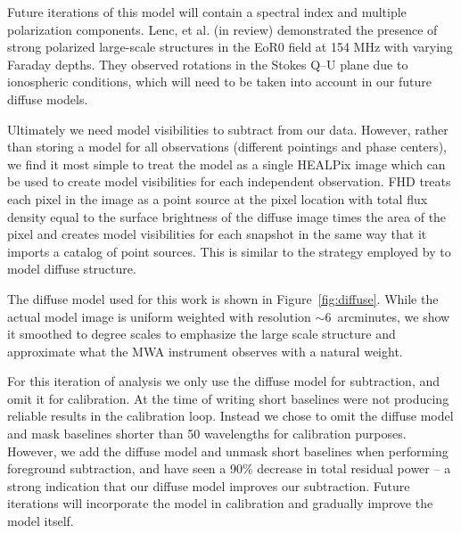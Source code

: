 \documentclass[iop]{emulateapj}
\begin{document}
Future iterations of this model will contain a spectral index 
and multiple polarization components.
Lenc, et al. (in review) demonstrated the presence of strong polarized large-scale structures 
in the EoR0 field at 154 MHz with varying Faraday depths. They observed rotations in the
Stokes Q--U plane due to ionospheric conditions, which will need to be taken into account
in our future diffuse models.

Ultimately we need model visibilities to subtract from our data. However, rather than storing 
a model for all observations (different pointings and phase centers), we find it most simple 
to treat the model as a single HEALPix image which can be used to create model visibilities 
for each independent observation. FHD treats each pixel in the image as a point source at 
the pixel location with total flux density equal to the surface brightness of the diffuse image times the area 
of the pixel and creates model visibilities for each snapshot in the same way that it imports 
a catalog of point sources. This is similar to the strategy employed by 
\citealt{Thyagarajan:2015} to model diffuse structure.

The diffuse model used for this work is shown in Figure~\ref{fig:diffuse}. While the actual 
model image is uniform weighted with resolution $\sim\!6$~arcminutes, we show it 
smoothed to degree scales to emphasize the large scale structure and approximate what 
the MWA instrument observes with a natural weight.

For this iteration of analysis we only use the diffuse model for subtraction, and omit it for 
calibration. At the time of writing short baselines were not producing reliable results in the 
calibration loop. Instead we chose to omit the diffuse model and mask baselines shorter 
than 50 wavelengths for calibration purposes. However, we add the diffuse model and 
unmask short baselines when performing foreground subtraction, and have seen a 90\% 
decrease in total residual power -- a strong indication that our diffuse model improves our 
subtraction. Future iterations will incorporate the model in calibration and gradually improve 
the model itself. 
\end{document}
